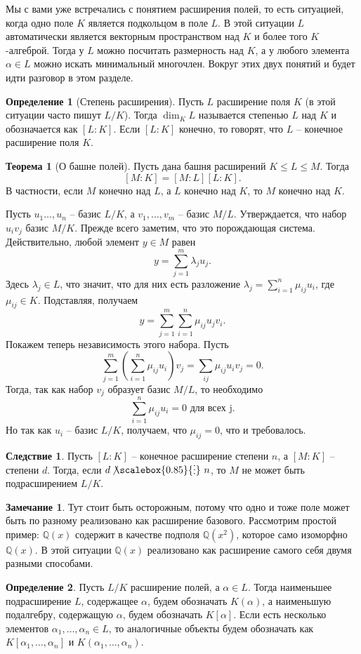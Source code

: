 \documentclass[12pt,a4paper,oneside]{book}
\theoremstyle{definition}
\newtheorem*{rem}{\color{green!50!blue}Замечание}
\newtheorem*{defn}{\color{yellow!30!red} Определение}
\newtheorem{thm}{\color{red!40!black}Теорема}
\newtheorem{cor}{\color{green!45!black}Следствие}
\renewcommand{\leq}{\leqslant}
\newcommand{\ndi}{\mathop{\not\scalebox{0.85}{\raisebox{-1.2pt}[0.5\height]{\vdots}}\,}}
\newcommand{\Q}{\mathbb Q}
\def\thrm{\begin{thm}}
\def\ethrm{\end{thm}}
\def\dfn{\begin{defn}}
\def\edfn{\end{defn}}
\def\crl{\begin{cor}}
\def\ecrl{\end{cor}}
\def\rm{\begin{rem}}
\def\erm{\end{rem}}
\begin{document}
Мы с вами уже встречались с понятием расширения полей, то есть ситуацией, когда одно поле $K$ является подкольцом в поле $L$. В этой ситуации $L$ автоматически является векторным пространством над $K$ и более того $K$-алгеброй. Тогда у $L$ можно посчитать размерность над $K$, а у любого элемента $\alpha \in L$ можно искать минимальный многочлен. Вокруг этих двух понятий и будет идти разговор в этом разделе.  


\dfn[Степень расширения] Пусть $L$ расширение поля $K$ (в этой ситуации часто пишут $L/K$). Тогда $\dim_K L$ называется степенью $L$ над $K$ и обозначается как $[L:K]$. Если $[L: K]$ конечно, то говорят, что $L$ -- конечное расширение поля $K$. 
\edfn

\thrm[О башне полей] Пусть дана башня расширений $K\leq L \leq M$. Тогда 
$$[M: K]=[M: L][L: K].$$
В частности, если $M$ конечно над $L$, а $L$ конечно над $K$, то $M$ конечно над $K$.


\proof Пусть $u_1\dots,u_n$ -- базис $L/K$, а $v_1,\dots,v_m$ -- базис $M/L$. Утверждается, что набор $u_iv_j$ базис $M/K$.
Прежде всего заметим, что это порождающая система. Действительно, любой элемент $y\in M$ равен 
$$y=\sum_{j=1}^m \lambda_j u_j. $$
Здесь $\lambda_j \in L$, что значит, что для них есть разложение $\lambda_j=\sum_{i=1}^n \mu_{ij} u_i$, где $\mu_{ij}\in K$. Подставляя, получаем 
$$ y=\sum_{j=1}^m\sum_{i=1}^n \mu_{ij} u_jv_i.$$
Покажем теперь независимость этого набора. Пусть
$$\sum_{j=1}^m\left(\sum_{i=1}^n \mu_{ij}u_i\right)v_j=\sum_{ij}\mu_{ij} u_i v_j=0.$$
Тогда, так как набор $v_j$ образует базис $M/L$, то необходимо
$$\sum_{i=1}^n \mu_{ij}u_i=0 \text{ для всех j}.$$
Но так как $u_i$ -- базис $L/K$, получаем, что $\mu_{ij}=0$, что и требовалось.
\endproof
 
\ethrm

\crl Пусть $[L: K]$ -- конечное расширение степени $n$, а $[M:K]$ -- степени $d$. Тогда, если $d \ndi n$, то $M$ не может быть подрасширением $L/K$.
\ecrl

\rm Тут стоит быть осторожным, потому что одно и тоже поле может быть по разному реализовано как расширение базового. Рассмотрим простой пример: $\Q(x)$ содержит в качестве подполя $\Q(x^2)$, которое само изоморфно $\Q(x)$. В этой ситуации $\Q(x)$ реализовано как расширение самого себя двумя разными способами.
\erm

\dfn Пусть $L/K$ расширение полей, а $\alpha \in L$. Тогда наименьшее подрасширение $L$, содержащее $\alpha$, будем обозначать $K(\alpha)$, а наименьшую подалгебру, содержащую $\alpha$, будем обозначать $K[\alpha]$. Если есть несколько элементов $\alpha_1,\dots,\alpha_n\in L$, то аналогичные объекты будем обозначать как $K[\alpha_1,\dots,\alpha_n]$ и $K(\alpha_1,\dots,\alpha_n)$.
\edfn
\end{document}
